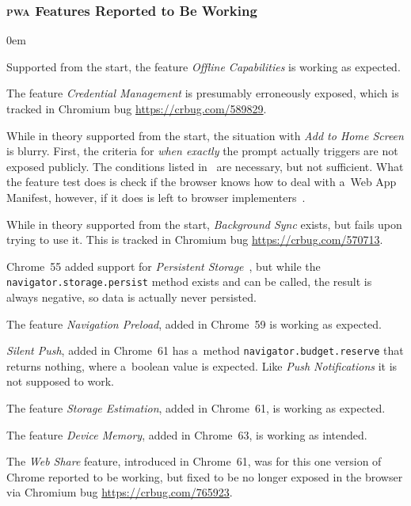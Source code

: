 \documentclass[sigconf]{acmart}
\begin{document}
\subsubsection{\textsc{pwa} Features Reported to Be Working}

\begin{description}
  \itemsep0em 
  \item[Offline Capabilities] Supported from the start, the feature \emph{Offline Capabilities}
    is working as expected.
  \item[Credential Management] The feature \emph{Credential Management}
    is presumably erroneously exposed,
     which is tracked in Chromium bug \url{https://crbug.com/589829}.    
  \item[Add to Home Screen] While in theory supported from the start,
    the situation with \emph{Add to Home Screen} is blurry.
    First, the criteria for \emph{when exactly} the prompt actually triggers
    are not exposed publicly. The conditions listed in~\cite{kinlan2017a2hs} are necessary,
    but not sufficient.
    What the feature test does is check if the browser knows how to deal
    with a~Web App Manifest, however, if it does
    is left to browser implementers~\cite{caceres2017manifest}.
  \item[Background Sync] While in theory supported from the start,
    \emph{Background Sync} exists, but fails upon trying to use it.
    This is tracked in Chromium bug \url{https://crbug.com/570713}.
  \item[Persistent Storage] Chrome~55 added support for
     \emph{Persistent Storage}~\cite{vankesteren2018storage},
     but while the \texttt{navigator.storage.persist} method exists and can be called,
     the result is always negative, so data is actually never persisted.
  \item[Navigation Preload] The feature \emph{Navigation Preload}, added in Chrome~59
    is working as expected.
  \item[Silent Push] \emph{Silent Push}, added in Chrome~61 has a~method
    \texttt{navigator.budget.reserve} that returns nothing, where a~boolean value is expected.
    Like \emph{Push Notifications} it is not supposed to work.
  \item[Storage Estimation] The feature \emph{Storage Estimation}, added in Chrome~61,
    is working as expected.
  \item[Device Memory] The feature \emph{Device Memory}, added in Chrome~63, 
    is working as intended.
  \item[Web Share] The \emph{Web Share} feature, introduced in Chrome~61,
    was for this one version of Chrome reported to be working, but fixed
    to be no longer exposed in the browser via Chromium bug \url{https://crbug.com/765923}.
\end{description} 
\end{document}
